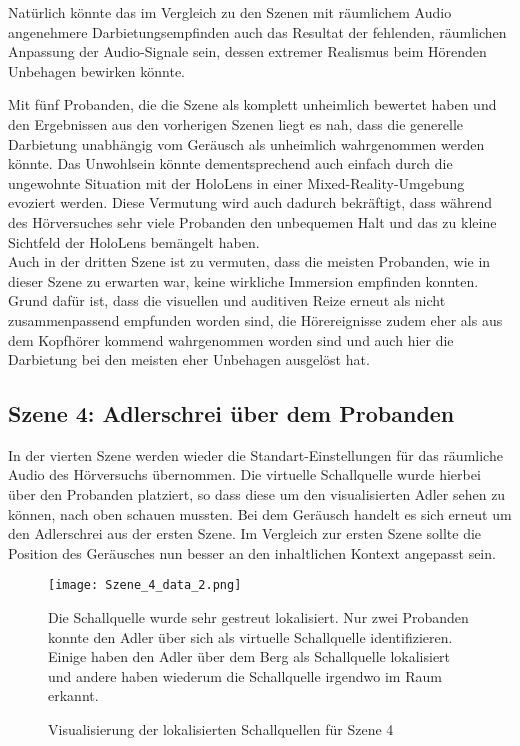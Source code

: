 Natürlich könnte das im Vergleich zu den Szenen mit räumlichem Audio angenehmere Darbietungsempfinden auch das Resultat der fehlenden, räumlichen Anpassung der Audio-Signale sein, dessen extremer Realismus beim Hörenden Unbehagen bewirken könnte.

Mit fünf Probanden, die die Szene als komplett unheimlich bewertet haben und den Ergebnissen aus den vorherigen Szenen liegt es nah, dass die generelle Darbietung unabhängig vom Geräusch als unheimlich wahrgenommen werden könnte. Das Unwohlsein könnte dementsprechend auch einfach durch die ungewohnte Situation mit der HoloLens in einer Mixed-Reality-Umgebung evoziert werden. Diese Vermutung wird auch dadurch bekräftigt, dass während des Hörversuches sehr viele Probanden den unbequemen Halt und das zu kleine Sichtfeld der HoloLens  bemängelt haben. \\

Auch in der dritten Szene ist zu vermuten, dass die meisten Probanden, wie in dieser Szene zu erwarten war,  keine wirkliche Immersion empfinden konnten. Grund dafür ist, dass die visuellen und auditiven Reize erneut als nicht zusammenpassend empfunden worden sind, die Hörereignisse zudem eher als aus dem Kopfhörer kommend wahrgenommen worden sind und auch hier die Darbietung bei den meisten eher Unbehagen ausgelöst hat. 

 \subsection{Szene 4: Adlerschrei über dem Probanden}
In der vierten Szene werden wieder die Standart-Einstellungen für das räumliche Audio des Hörversuchs übernommen. Die virtuelle Schallquelle wurde hierbei über den Probanden platziert, so dass diese um den visualisierten Adler sehen zu können, nach oben schauen mussten. Bei dem Geräusch handelt es sich erneut um den Adlerschrei aus der ersten Szene. Im Vergleich zur ersten Szene sollte die Position des Geräusches nun besser an den inhaltlichen Kontext angepasst sein. \\

   \begin{figure}[H]
\centering
\texttt{[image: Szene\_4\_data\_2.png]}
\caption{Visualisierung der lokalisierten Schallquellen für Szene 4}
Die Schallquelle wurde sehr gestreut lokalisiert. Nur zwei Probanden konnte den Adler über sich als virtuelle Schallquelle identifizieren. Einige haben den Adler über dem Berg als Schallquelle lokalisiert und andere haben wiederum die Schallquelle irgendwo im Raum erkannt. 
\label{fig:Szene_4_data}
\end{figure} 
\newpage

